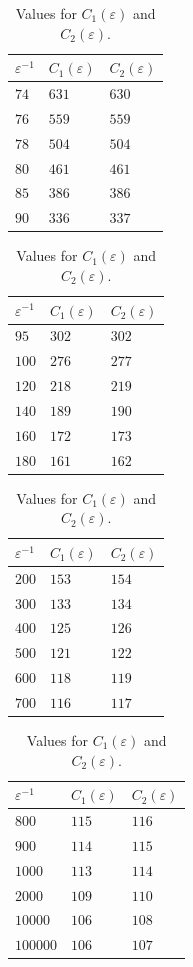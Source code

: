 \documentclass[12pt]{amsart}
\begin{document}
\begin{table}
\centering
    \begin{tabular}{ | l | l | l |}
    \hline
    $\varepsilon^{-1}$ & $C_1(\varepsilon) $ & $C_2(\varepsilon)$ \\  
    \hline
    $74$& $631$ & $630$ \\
    \hline
    $76$& $559$ & $559$ \\
    \hline
    $78$& $504$ & $504$ \\
    \hline
    $80$& $461$ & $461$ \\
    \hline
    $85$& $386$ & $386$ \\
    \hline
    $90$& $336$ & $337$ \\
    \hline
    \end{tabular}
\begin{tabular}{ | l | l | l |}
    \hline
    $\varepsilon^{-1}$ & $C_1(\varepsilon) $ & $C_2(\varepsilon)$  \\
    \hline
    $95$& $302$ & $302$ \\
    \hline
    $100$& $276$ & $277$ \\
    \hline
    $120$& $218$& $219$\\
    \hline
    $140$& $189$& $190$ \\
    \hline
    $160$& $172$ & $173$ \\
    \hline
    $180$ & $161$ & $162$ \\
    \hline
    \end{tabular}
    \begin{tabular}{ | l | l | l |}
    \hline
    $\varepsilon^{-1}$ & $C_1(\varepsilon) $ & $C_2(\varepsilon)$ \\  
    \hline
    $200$& $153$ & $154$ \\
    \hline
    $300$& $133$ & $134$ \\
    \hline
    $400$& $125$ & $126$ \\
    \hline
    $500$& $121$ & $122$\\
    \hline
    $600$& $118$ & $119$\\
    \hline
    $700$& $116$ & $117$\\
    \hline
    \end{tabular}
    \begin{tabular}{ | l | l | l |}
    \hline
    $\varepsilon^{-1}$ & $C_1(\varepsilon) $ & $C_2(\varepsilon)$ \\  
    \hline
    $800$& $115$ & $116$\\
    \hline
    $900$& $114$ & $115$\\
    \hline
    $1000$& $113$ & $114$\\
    \hline
    $2000$& $109$ & $110$\\
    \hline
    $10000$& $106$ & $108$\\
    \hline
    $100000$& $106$ & $107$\\
    \hline
    \end{tabular}   
\caption{Values for $C_1(\varepsilon)$ and $C_2(\varepsilon)$.}  
\label{tab:fF}  
\end{table}
\end{document}
